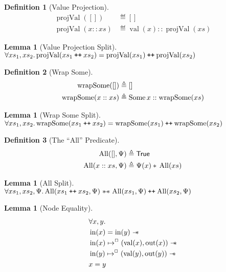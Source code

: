 \documentclass[a4paper, 10pt]{report}
\theoremstyle{definition}
\newtheorem{lemma}[theorem]{Lemma}
\newtheorem{definition}{Definition}[section]
\newcommand{\AllP}{\operatorname{All}}
\newcommand{\projval}{\operatorname{projVal}}
\newcommand{\wrapsome}{\operatorname{wrapSome}}
\newcommand{\nIn}[1]{\operatorname{in}(#1)}
\newcommand{\nVal}[1]{\operatorname{val}(#1)}
\newcommand{\nOut}[1]{\operatorname{out}(#1)}
\newcommand\catenate{\mathbin{\text{\ttfamily\upshape ++}}}
\newcommand{\isNode}[1]{\nIn{#1} \mapsto^{\persistently} (\nVal{#1}, \nOut{#1})}
\begin{document}
\begin{definition}[Value Projection]\label{COMMON:Def:val-proj}
  \begin{align*}
    \projval([]) &\eqdef []\\
    \projval(x :: xs) &\eqdef \nVal{x} :: \projval(xs)
  \end{align*}
\end{definition}

\begin{lemma}[Value Projection Split]\label{lemma:value-proj-split}
  $\All xs_1, xs_2.\\
  \projval(xs_1 \catenate xs_2) = \projval(xs_1) \catenate \projval(xs_2)$
\end{lemma}

\begin{definition}[Wrap Some]\label{COMMON:Def:wrap-some}
  \begin{align*}
    \wrapsome([]) &\eqdef []\\
    \wrapsome(x :: xs) &\eqdef \Some{x} :: \wrapsome(xs)
  \end{align*}
\end{definition}

\begin{lemma}[Wrap Some Split]\label{lemma:wrap-some-split}
  $\All xs_1, xs_2.\\
  \wrapsome(xs_1 \catenate xs_2) = \wrapsome(xs_1) \catenate \wrapsome(xs_2)$
\end{lemma}


\begin{definition}[The ``All'' Predicate]\label{COMMON:Def:All}
  \begin{align*}
    \AllP([], \Psi) &\eqdef \TRUE\\
    \AllP(x :: xs, \Psi) &\eqdef \Psi(x) \star{} \AllP(xs)
  \end{align*}
\end{definition}

\begin{lemma}[All Split]\label{lemma:all-split}
  $\All xs_1, xs_2, \Psi.\\
  \AllP(xs_1 \catenate xs_2, \Psi) \wandIff \AllP(xs_1, \Psi) \catenate \AllP(xs_2, \Psi)$
\end{lemma}


\begin{lemma}[Node Equality]\label{lemma:nIn-equal}
  \begin{align*}
    &\All x, y.\\
    &\nIn{x} = \nIn{y} \wand\\
    &\isNode{x} \wand\\
    &\isNode{y} \wand\\
    &x = y
  \end{align*}
\end{lemma}
\end{document}
